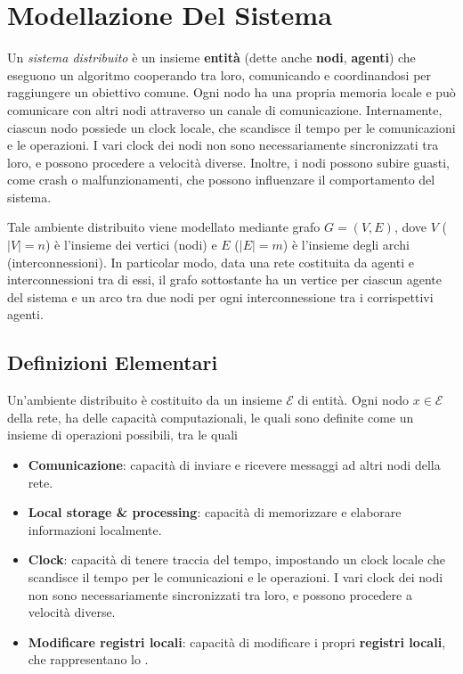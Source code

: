 \chapter{Modellazione Del Sistema}

\begin{definizione}
Un \textit{sistema distribuito} è un insieme \textbf{entità} (dette anche \textbf{nodi}, \textbf{agenti}) che eseguono un algoritmo cooperando tra loro, comunicando e coordinandosi per raggiungere un obiettivo comune. Ogni nodo ha una propria memoria locale e può comunicare con altri nodi attraverso un canale di comunicazione. Internamente, ciascun nodo possiede un clock locale, che scandisce il tempo per le comunicazioni e le operazioni. I vari clock dei nodi non sono necessariamente sincronizzati tra loro, e possono procedere a velocità diverse. Inoltre, i nodi possono subire guasti, come crash o malfunzionamenti, che possono influenzare il comportamento del sistema.
\end{definizione}

Tale ambiente distribuito viene modellato mediante grafo $G = (V, E)$, dove $V$ ($|V| = n$) è l'insieme dei vertici (nodi) e $E$ ($|E| = m$) è l'insieme degli archi (interconnessioni). In particolar modo, data una
rete costituita da agenti e interconnessioni tra di essi, il grafo sottostante ha un vertice per
ciascun agente del sistema e un arco tra due nodi per ogni interconnessione tra i
corrispettivi agenti.

\section{Definizioni Elementari}

\begin{definizione}[Entità]
Un'ambiente distribuito è costituito da un insieme $\mathcal{E}$ di entità. Ogni nodo $x \in \mathcal{E}$ della rete, ha delle capacità computazionali, le quali sono definite come un insieme di operazioni possibili, tra le quali
\begin{itemize}
    \item \textbf{Comunicazione}: capacità di inviare e ricevere messaggi ad altri nodi della rete.
    \item \textbf{Local storage \& processing}: capacità di memorizzare e elaborare informazioni localmente.
    \item \textbf{Clock}: capacità di tenere traccia del tempo, impostando un clock locale che scandisce il tempo per le comunicazioni e le operazioni. I vari clock dei nodi non sono necessariamente sincronizzati tra loro, e possono procedere a velocità diverse.
    \item \textbf{Modificare registri locali}: capacità di modificare i propri \textbf{registri locali}, che rappresentano lo .
\end{itemize}
\end{definizione}

